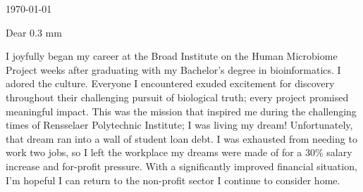 \documentclass[10pt,letterpaper]{article}
\newcommand{\titleto}[1]{\renewcommand{\titleto}{#1}}
\newcommand{\nameto}[1]{\renewcommand{\nameto}{#1}}
\newcommand{\addrto}[1]{\renewcommand{\addrto}{#1}}
\begin{document}

\begin{flushright}

    \today
\end{flushright}


\nameto
\addrto


Dear \titleto \hspace{0.3 mm} \nameto,


I joyfully began my career at the Broad Institute on the Human Microbiome Project weeks after graduating with my Bachelor’s degree in bioinformatics. I adored the culture. Everyone I encountered exuded excitement for discovery throughout their challenging pursuit of biological truth; every project promised meaningful impact. This was the mission that inspired me during the challenging times of Rensselaer Polytechnic Institute; I was living my dream! Unfortunately, that dream ran into a wall of student loan debt. I was exhausted from needing to work two jobs, so I left the workplace my dreams were made of for a 30\% salary increase and for-profit pressure. With a significantly improved financial situation, I'm hopeful I can return to the non-profit sector I continue to consider home.
\end{document}
